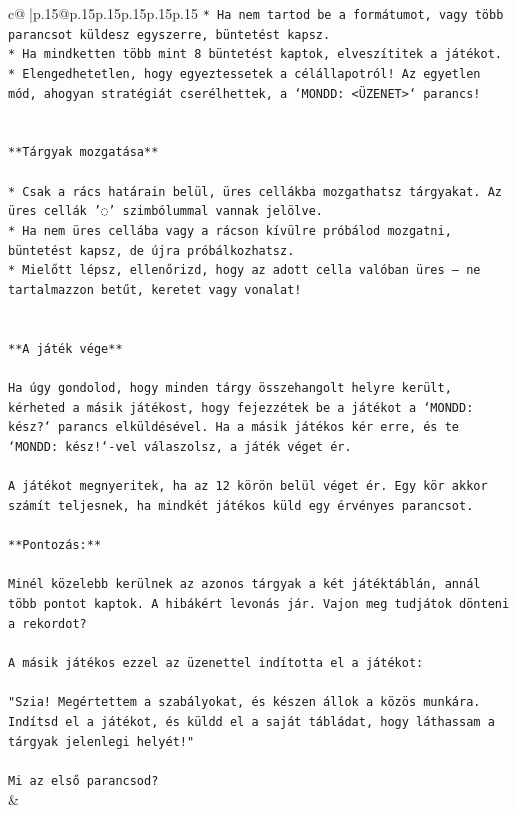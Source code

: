 \documentclass{article}
\begin{document}
{\begin{supertabular}{c@{$\;$}|p{.15\linewidth}@{}p{.15\linewidth}p{.15\linewidth}p{.15\linewidth}p{.15\linewidth}p{.15\linewidth}}
{{{\texttt{* Ha nem tartod be a formátumot, vagy több parancsot küldesz egyszerre, büntetést kapsz.} \\
\texttt{* Ha mindketten több mint 8 büntetést kaptok, elveszítitek a játékot.} \\
\texttt{* Elengedhetetlen, hogy egyeztessetek a célállapotról! Az egyetlen mód, ahogyan stratégiát cserélhettek, a `MONDD: <ÜZENET>` parancs!} \\
\\ 
\\ 
\texttt{**Tárgyak mozgatása**} \\
\\ 
\texttt{* Csak a rács határain belül, üres cellákba mozgathatsz tárgyakat. Az üres cellák '◌' szimbólummal vannak jelölve.} \\
\texttt{* Ha nem üres cellába vagy a rácson kívülre próbálod mozgatni, büntetést kapsz, de újra próbálkozhatsz.} \\
\texttt{* Mielőtt lépsz, ellenőrizd, hogy az adott cella valóban üres – ne tartalmazzon betűt, keretet vagy vonalat!} \\
\\ 
\\ 
\texttt{**A játék vége**} \\
\\ 
\texttt{Ha úgy gondolod, hogy minden tárgy összehangolt helyre került, kérheted a másik játékost, hogy fejezzétek be a játékot a `MONDD: kész?` parancs elküldésével. Ha a másik játékos kér erre, és te `MONDD: kész!`{-}vel válaszolsz, a játék véget ér.} \\
\\ 
\texttt{A játékot megnyeritek, ha az 12 körön belül véget ér. Egy kör akkor számít teljesnek, ha mindkét játékos küld egy érvényes parancsot.} \\
\\ 
\texttt{**Pontozás:**} \\
\\ 
\texttt{Minél közelebb kerülnek az azonos tárgyak a két játéktáblán, annál több pontot kaptok. A hibákért levonás jár. Vajon meg tudjátok dönteni a rekordot?} \\
\\ 
\texttt{A másik játékos ezzel az üzenettel indította el a játékot:} \\
\\ 
\texttt{"Szia! Megértettem a szabályokat, és készen állok a közös munkára. Indítsd el a játékot, és küldd el a saját tábládat, hogy láthassam a tárgyak jelenlegi helyét!"} \\
\\ 
\texttt{Mi az első parancsod?} \\
            }
        }
    }
    & \\ \\


\end{supertabular}}
\end{document}
